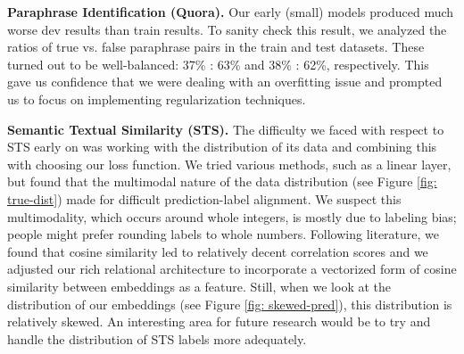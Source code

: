 \documentclass{article}
\begin{document}
\textbf{Paraphrase Identification (Quora).} Our early (small) models produced much worse dev results than train results. To sanity check this result, we analyzed the ratios of true vs. false paraphrase pairs in the train and test datasets. These turned out to be well-balanced:  37\% : 63\% and 38\% : 62\%, respectively. This gave us confidence that we were dealing with an overfitting issue and prompted us to focus on implementing regularization techniques. 

\textbf{Semantic Textual Similarity (STS).} The difficulty we faced with respect to STS early on was working with the distribution of its data and combining this with choosing our loss function. We tried various methods, such as a linear layer, but found that the multimodal nature of the data distribution (see Figure \ref{fig: true-dist}) made for difficult prediction-label alignment. We suspect this multimodality, which occurs around whole integers, is mostly due to labeling bias; people might prefer rounding labels to whole numbers. Following literature, we found that cosine similarity led to relatively decent correlation scores and we adjusted our rich relational architecture to incorporate a vectorized form of cosine similarity between embeddings as a feature. Still, when we look at the distribution of our embeddings (see Figure \ref{fig: skewed-pred}), this distribution is relatively skewed. An interesting area for future research would be to try and handle the distribution of STS labels more adequately.
\vspace{-0.3cm}
\end{document}
